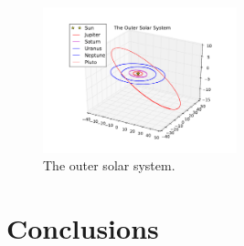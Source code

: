 \documentclass[10pt,showpacs,preprintnumbers,footinbib,amsmath,amssymb,aps,prl,twocolumn,groupedaddress,superscriptaddress,showkeys]{revtex4-1}
\begin{document}
\begin{figure}
\centering
	\includegraphics[width=0.5\textwidth]{figures/SSouter.pdf}
	\caption{The outer solar system.}
	\label{fig:sso}
\end{figure}








\section{Conclusions}
\end{document}
